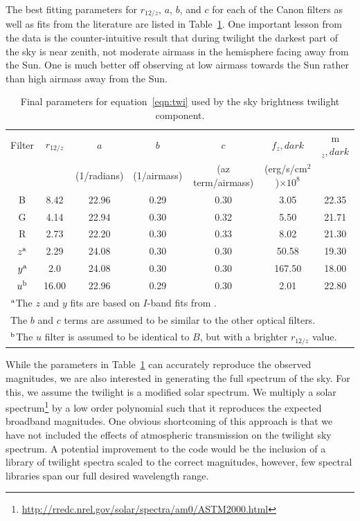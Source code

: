 \documentclass[]{spie}
\begin{document}
The best fitting parameters for $r_{12/z}$, $a$, $b$, and $c$ for each of the Canon filters as well as fits from the literature are listed in Table~\ref{table:canonFits}.  One important lesson from the data is the counter-intuitive result that during twilight the darkest part of the sky is near zenith, not moderate airmass in the hemisphere facing away from the Sun. One is much better off observing at low airmass towards the Sun rather than high airmass away from the Sun.

\begin{table}
\caption{Final parameters for equation~\ref{eqn:twi} used by the sky brightness twilight component. 
\label{table:canonFits}}
\begin{center}
\begin{tabular}{c c c c c c c}
  Filter & $r_{12/z}$ & $a$  & $b$  & $c$  & $f_z,dark$ & m$_z,dark$ \\
  & & (1/radians) & (1/airmass) & (az term/airmass) & (erg/s/cm$^2$)$\times 10^8$ \\
  \hline
  \hline
  B  & 8.42 & 22.96 & 0.29 & 0.30 & 3.05  &  22.35 \\
  G  & 4.14 & 22.94 & 0.30 & 0.32 & 5.50  &  21.71 \\
  R  & 2.73 & 22.20 & 0.30 & 0.33 & 8.02  &  21.30 \\
  $z^{\rm{a}}$ & 2.29 & 24.08 & 0.30 & 0.30 & 50.58  &  19.30 \\
  $y^{\rm{a}}$  & 2.0 & 24.08 & 0.30 & 0.30 & 167.50  &  18.00 \\
  $u^{\rm{b}}$  & 16.00 & 22.96 & 0.29 & 0.30 & 2.01  &  22.80\\
 \hline
 \multicolumn{7}{l}{$^{\rm{a}}$The $z$ and $y$ fits are based on $I$-band fits from \cite{Patat06}.} \\
 \multicolumn{7}{l}{The $b$ and $c$ terms are assumed to be similar to the other optical filters.} \\
 \multicolumn{7}{l}{$^{\rm{b}}$The $u$ filter is assumed to be identical to $B$, but with a brighter $r_{12/z}$ value.}
 \end{tabular}
 \end{center}
\end{table}


While the parameters in Table~\ref{table:canonFits} can accurately reproduce the observed magnitudes, we are also interested in generating the full spectrum of the sky.  For this, we assume the twilight is a modified solar spectrum.  We multiply a solar spectrum\footnote{\url{http://rredc.nrel.gov/solar/spectra/am0/ASTM2000.html}} by a low order polynomial such that it reproduces the expected broadband magnitudes.  One obvious shortcoming of this approach is that we have not included the effects of atmospheric transmission on the twilight sky spectrum. A potential improvement to the code would be the inclusion of a library of twilight spectra scaled to the correct magnitudes, however, few spectral libraries span our full desired wavelength range.
\end{document}
